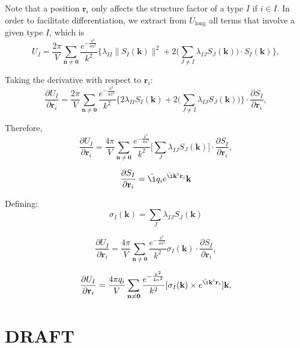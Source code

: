\documentclass[11pt]{article}
\newcommand{\vt}[1]{\boldsymbol{\mathbf{#1}}}           %
\newcommand{\tr}[1]{#1^\text{t}}                        %
\newcommand{\im}{\hat{\i}}                              %
\begin{document}
Note that a position $\vt r_i$ only affects the structure factor of a type $I$ if $i \in I$. In order to facilitate differentiation, we extract from $U_\text{long}$ all terms that involve a given type $I$, which is
\begin{equation*}
U_I = \frac{2\pi}{V}\sum_{\vt n \neq \vt 0} \frac{e^{-\frac{k^2}{4\alpha^2}}}{k^2} \bigg\{\lambda_{II} \|S_I(\vt k)\|^2 + 2 \bigg(\sum_{J \neq I} \lambda_{IJ} S_J(\vt k)\bigg) \cdot S_I(\vt k) \bigg\},
\end{equation*}

Taking the derivative with respect to $\vt r_i$:
\begin{equation*}
\frac{\partial U_I}{\partial \vt r_i} = \frac{2\pi}{V}\sum_{\vt n \neq \vt 0} \frac{e^{-\frac{k^2}{4\alpha^2}}}{k^2} \bigg\{2 \lambda_{II} S_I(\vt k) + 2 \bigg(\sum_{J \neq I} \lambda_{IJ} S_J(\vt k)\bigg) \bigg\}  \cdot \frac{\partial S_I}{\partial \vt r_i},
\end{equation*}

Therefore,
\begin{equation*}
\frac{\partial U_I}{\partial \vt r_i} = \frac{4\pi}{V} \sum_{\vt n \neq \vt 0} \frac{e^{-\frac{k^2}{4\alpha^2}}}{k^2} \bigg[ \sum_J \lambda_{IJ} S_J(\vt k) \bigg] \cdot \frac{\partial S_I}{\partial \vt r_i},
\end{equation*}

\begin{equation*}
\frac{\partial S_I}{\partial \vt r_i} = \im q_i e^{\im \tr{\vt k}{\vt r}_i}{\vt k}
\end{equation*}

Defining:
\begin{equation*}
\sigma_I(\vt k) = \sum_J \lambda_{IJ} S_J(\vt k)
\end{equation*}

\begin{equation*}
\frac{\partial U_I}{\partial \vt r_i} = \frac{4\pi}{V} \sum_{\vt n \neq \vt 0} \frac{e^{-\frac{k^2}{4\alpha^2}}}{k^2} \sigma_I(\vt k) \cdot \frac{\partial S_I}{\partial \vt r_i},
\end{equation*}

\begin{equation*}
\frac{\partial U_I}{\partial \vt r_i} = \frac{4\pi q_i}{V} \sum_{\vt n \neq \vt 0} \frac{e^{-\frac{k^2}{4\alpha^2}}}{k^2} [\sigma_I(\vt k) \times e^{\im \tr{\vt k}{\vt r}_i}]{\vt k},
\end{equation*}

\section{DRAFT}
\end{document}
